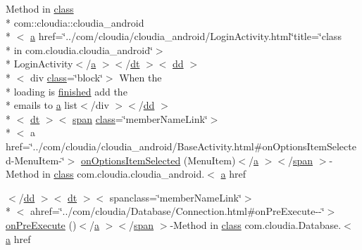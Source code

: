 \begin{DoxyCompactItemize}
 Method in \hyperlink{_tools_8html_acf06f836132665ba8114f5a414c2403f}{class} \\*
com\-::cloudia\-::cloudia\-\_\-android\\*
$<$ \hyperlink{style_8css_a5e8981582017bb8b84c21f148345d1f7}{a} href=\char`\"{}../com/cloudia/cloudia\-\_\-android/Login\-Activity.\-html\char`\"{}title=\char`\"{}class \\*
in com.\-cloudia.\-cloudia\-\_\-android\char`\"{}$>$\\*
 Login\-Activity$<$/\hyperlink{style_8css_a5e8981582017bb8b84c21f148345d1f7}{a} $>$$<$/\hyperlink{stylesheet_8css_a107565fb4039d33b041380d6e0ea1d80}{dt} $>$$<$ \hyperlink{stylesheet_8css_a47f4718a86835a7771ec592ece845221}{dd} $>$\\*
$<$ div \hyperlink{_tools_8html_acf06f836132665ba8114f5a414c2403f}{class}=\char`\"{}block\char`\"{}$>$ When the \\*
loading is \hyperlink{_login_activity_8html_a8c2a5b4f8660d96f558cb54a652c3e2a}{finished} add the \\*
emails to \hyperlink{style_8css_a5e8981582017bb8b84c21f148345d1f7}{a} list$<$/div $>$$<$/\hyperlink{stylesheet_8css_a47f4718a86835a7771ec592ece845221}{dd} $>$\\*
$<$ \hyperlink{stylesheet_8css_a107565fb4039d33b041380d6e0ea1d80}{dt} $>$$<$ \hyperlink{stylesheet_8css_a8343996ebcf16220b04e54659aac31cc}{span} \hyperlink{_tools_8html_acf06f836132665ba8114f5a414c2403f}{class}=\char`\"{}member\-Name\-Link\char`\"{}$>$\\*
$<$ a href=\char`\"{}../com/cloudia/cloudia\-\_\-android/Base\-Activity.\-html\#on\-Options\-Item\-Selected-\/Menu\-Item-\/\char`\"{}$>$ \hyperlink{index-13_8html_ac57f3acdafc094b03b02f02fc55f0986}{on\-Options\-Item\-Selected} (Menu\-Item)$<$/\hyperlink{style_8css_a5e8981582017bb8b84c21f148345d1f7}{a} $>$$<$/\hyperlink{stylesheet_8css_a8343996ebcf16220b04e54659aac31cc}{span} $>$-\/Method in \hyperlink{_tools_8html_acf06f836132665ba8114f5a414c2403f}{class} com.\-cloudia.\-cloudia\-\_\-android.$<$ \hyperlink{style_8css_a5e8981582017bb8b84c21f148345d1f7}{a} href
\item 
$<$/\hyperlink{stylesheet_8css_a47f4718a86835a7771ec592ece845221}{dd} $>$$<$ \hyperlink{stylesheet_8css_a107565fb4039d33b041380d6e0ea1d80}{dt} $>$$<$ spanclass=\char`\"{}member\-Name\-Link\char`\"{}$>$\\*
$<$ ahref=\char`\"{}../com/cloudia/Database/Connection.\-html\#on\-Pre\-Execute-\/-\/\char`\"{}$>$ \hyperlink{index-13_8html_a0fb0fb0158f23988317e9e0a3187db5d}{on\-Pre\-Execute} ()$<$/\hyperlink{style_8css_a5e8981582017bb8b84c21f148345d1f7}{a} $>$$<$/\hyperlink{stylesheet_8css_a8343996ebcf16220b04e54659aac31cc}{span} $>$-\/Method in \hyperlink{_tools_8html_acf06f836132665ba8114f5a414c2403f}{class} com.\-cloudia.\-Database.$<$ \hyperlink{style_8css_a5e8981582017bb8b84c21f148345d1f7}{a} href

\end{DoxyCompactItemize}
